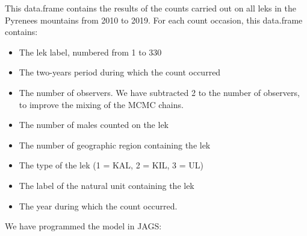\documentclass[a4paper]{article}
\newenvironment{Default Paragraph Font}{}{}
\begin{document}
This data.frame contains the results of the counts carried out on all
leks in the Pyrenees mountains from 2010 to 2019. For each count
occasion, this data.frame contains:\\

\begin{itemize}
\item The lek label, numbered from 1 to 330
\item The two-years period during which  the count occurred
\item The number of observers. We have subtracted 2 to the number of
  observers, to improve the mixing of the MCMC chains.
\item The number of males counted on the lek
\item The number of geographic region containing the lek
\item The type of the lek (1 = KAL, 2 = KIL, 3 = UL)
\item The label of the natural unit containing the lek
\item The year during which the count occurred.\\
\end{itemize}

We have programmed the model in JAGS:
\end{document}
